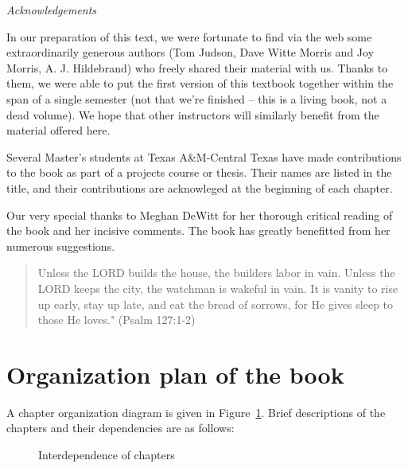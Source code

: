 \medskip

\noindent
\emph{Acknowledgements}
\smallskip

In our preparation of this text, we were fortunate to find via the web  some extraordinarily generous authors (Tom Judson, Dave Witte Morris and Joy Morris, A. J. Hildebrand) who freely shared their material with us. Thanks to them, we were able to put the first version of this  textbook together within the span of a single semester (not that we're finished -- this is a living book, not a dead volume). We hope that other instructors will similarly benefit from the material offered here.  

Several Master's students at Texas A\&M-Central Texas have made contributions to the book as part of a projects course or thesis. Their names are listed in the title, and their contributions are acknowleged at the beginning of each chapter. 

Our very special thanks to Meghan DeWitt for her thorough critical reading of the book and her incisive comments. The book has greatly benefitted from her numerous suggestions.
\medskip 

\begin{quote}
Unless the LORD builds the house, the builders labor in vain. Unless the LORD keeps the city, the watchman is wakeful in vain.  It is vanity to rise up early, stay up late, and eat the bread of sorrows, for He gives sleep to those He loves."  (Psalm 127:1-2)
\end{quote}

\section*{Organization plan of the book}
A chapter organization diagram is given in Figure~\ref{fig:organization}. Brief descriptions of the chapters and their dependencies are as follows:
\begin{figure}[htb]
	  \caption{\label{fig:organization} Interdependence of chapters}
\end{figure}

